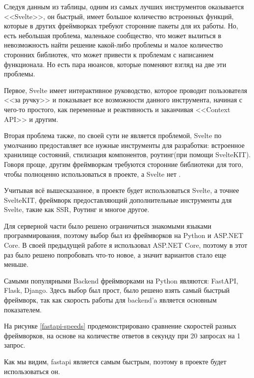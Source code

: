 Следуя данным из таблицы, одним из самых лучших инструментов оказывается <<Svelte>>, он быстрый, имеет большое количество встроенных функций, которые в других фреймворках требуют сторонние пакеты для их работы. Но, есть небольшая проблема, маленькое сообщество, что может вылиться в невозможность найти решение какой-либо проблемы и малое количество сторонних библиотек, что может привести к проблемам с написанием функционала. Но есть пара нюансов, которые поменяют взгляд на две эти проблемы.

Первое, Svelte имеет интерактивное руководство, которое проводит пользователя <<за ручку>> и показывает все возможности данного инструмента, начиная с чего-то простого, как переменные и реактивность и заканчивая <<Context API>> и другим.

Вторая проблема также, по своей сути не является проблемой, Svelte по умолчанию предоставляет все нужные инструменты для разработки: встроенное хранилище состояний, стилизация компонентов, роутинг(при помощи SvelteKIT). Говоря проще, другим фреймворкам требуются сторонние библиотеки для того, чтобы полноценно использоваться в проекте, а Svelte нет \cite{svelte-ecosystem}.

Учитывая всё вышесказанное, в проекте будет использоваться Svelte, а точнее SvelteKIT, фреймворк предоставляющий дополнительные инструменты для Svelte, такие как SSR, Роутинг и многое другое.

Для серверной части было решено ограничиться знакомыми языками программирования, поэтому выбор был из фреймворков на Python и ASP.NET Core. В своей предыдущей работе я использовал ASP.NET Core, поэтому в этот раз было решено попробовать что-то новое, а значит вариантов стало еще меньше.

Самыми популярными Backend фреймворками на Python являются: FastAPI, Flask, Django. Здесь выбор был прост, было решено взять самый быстрый фреймворк, так как скорость работы для backend'a является основным показателем.

На рисунке \ref{fastapi-speeds} продемонстрировано сравнение скоростей разных фреймворков, на основе на количестве ответов в секунду при 20 запросах на 1 запрос.


Как мы видим, fastapi является самым быстрым, поэтому в проекте будет использоваться он.
